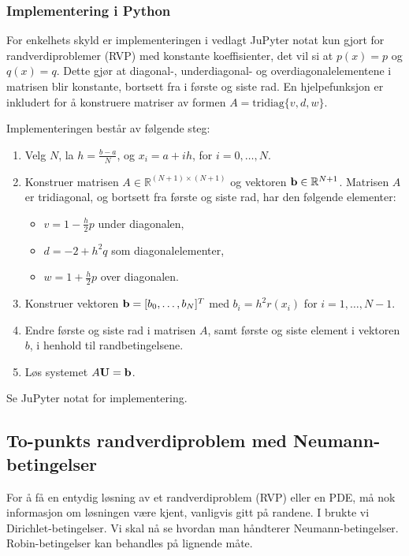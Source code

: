 \subsubsection*{Implementering i Python}
For enkelhets skyld er implementeringen i vedlagt JuPyter notat kun gjort for randverdiproblemer (RVP) med konstante koeffisienter, det vil si at \(p(x) = p\) og \(q(x) = q\). Dette gjør at diagonal-, underdiagonal- og overdiagonalelementene i matrisen blir konstante, bortsett fra i første og siste rad. En hjelpefunksjon er inkludert for å konstruere matriser av formen \(A = \text{tridiag}\{v, d, w\}\).

Implementeringen består av følgende steg:
\begin{enumerate}
    \item Velg \(N\), la \(h = \frac{b - a}{N}\), og \(x_i = a + ih\), for \(i = 0, \dots, N\).
    
    \item Konstruer matrisen \(A \in \mathbb{R}^{(N+1) \times (N+1)}\) og vektoren \(\mathbf{b} \in \mathbb{R}^{N+1}\). Matrisen \(A\) er tridiagonal, og bortsett fra første og siste rad, har den følgende elementer:
    \begin{itemize}
        \item \(v = 1 - \frac{h}{2}p\) under diagonalen,
        \item \(d = -2 + h^2q\) som diagonalelementer,
        \item \(w = 1 + \frac{h}{2}p\) over diagonalen.
    \end{itemize}
    \item Konstruer vektoren \(\mathbf{b} = [b_0, \dots, b_N]^T\) med \(b_i = h^2r(x_i)\) for \(i = 1, \dots, N - 1\).
    \item Endre første og siste rad i matrisen \(A\), samt første og siste element i vektoren \(b\), i henhold til randbetingelsene.
    \item Løs systemet \(A\mathbf{U} = \mathbf{b}\).
\end{enumerate}
Se JuPyter notat for implementering.

\subsection{To-punkts randverdiproblem med Neumann-betingelser}
For å få en entydig løsning av et randverdiproblem (RVP) eller en PDE, må nok informasjon om løsningen være kjent, vanligvis gitt på randene. 
I  brukte vi Dirichlet-betingelser. Vi skal nå se hvordan man håndterer Neumann-betingelser. Robin-betingelser kan behandles på lignende måte.

